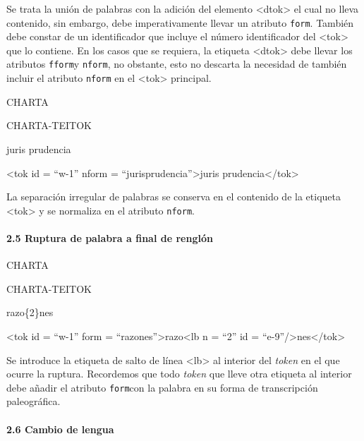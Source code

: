 \documentclass[
]{book}
\begin{document}
Se trata la unión de palabras con la adición del elemento { \textless dtok\textgreater{}} el cual no lleva contenido, sin embargo, debe imperativamente llevar un atributo \texttt{form}. También debe constar de un identificador que incluye el número identificador del { \textless tok\textgreater{}} que lo contiene. En los casos que se requiera, la etiqueta { \textless dtok\textgreater{}} debe llevar los atributos \texttt{fform}y \texttt{nform}, no obstante, esto no descarta la necesidad de también incluir el atributo \texttt{nform} en el { \textless tok\textgreater{}} principal.

CHARTA

CHARTA-TEITOK

juris prudencia

{\textless tok} {id} {=} {``w-1''} {nform} {=} {``jurisprudencia''}{\textgreater{}}juris prudencia{\textless/tok\textgreater{}}

La separación irregular de palabras se conserva en el contenido de la etiqueta { \textless tok\textgreater{}} y se normaliza en el atributo \texttt{nform}.

\hypertarget{ruptura-de-palabra-a-final-de-rengluxf3n}{%
\paragraph*{2.5 Ruptura de palabra a final de renglón}\label{ruptura-de-palabra-a-final-de-rengluxf3n}}

CHARTA

CHARTA-TEITOK

razo\{2\}nes

{\textless tok} {id} {=} {``w-1''} {form} {=} {``razones''}{\textgreater{}}razo{\textless lb} {n} {=} {``2''} {id} {=} {``e-9''}{/\textgreater{}}nes{\textless/tok\textgreater{}}

Se introduce la etiqueta de salto de línea { \textless lb\textgreater{}} al interior del \emph{token} en el que ocurre la ruptura. Recordemos que todo \emph{token} que lleve otra etiqueta al interior debe añadir el atributo \texttt{form}con la palabra en su forma de transcripción paleográfica.

\hypertarget{cambio-de-lengua}{%
\paragraph*{2.6 Cambio de lengua}\label{cambio-de-lengua}}
\end{document}

